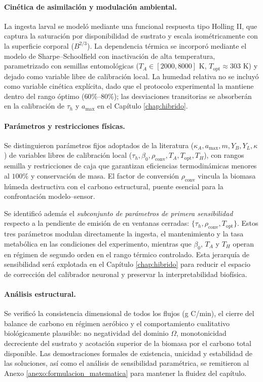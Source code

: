 \paragraph{Cinética de asimilación y modulación ambiental.} La ingesta larval se modeló mediante una funcional respuesta tipo Holling II, que captura la saturación por disponibilidad de sustrato y escala isométricamente con la superficie corporal ($B^{2/3}$). La dependencia térmica se incorporó mediante el modelo de Sharpe--Schoolfield con inactivación de alta temperatura, parametrizado con semillas entomológicas ($T_A \in [2000, 8000]$ K, $T_{\mathrm{opt}} \approx 303$ K) y dejado como variable libre de calibración local. La humedad relativa no se incluyó como variable cinética explícita, dado que el protocolo experimental la mantiene dentro del rango óptimo ($60\%$--$80\%$); las desviaciones transitorias se absorberán en la calibración de $\tau_h$ y $a_{\max}$ en el Capítulo \ref{chap:hibrido}.

\paragraph{Parámetros y restricciones físicas.} Se distinguieron parámetros fijos adoptados de la literatura ($\kappa_A, a_{\max}, m, Y_B, Y_L, \kappa$) de variables libres de calibración local ($\tau_h, \beta_0, \rho_{\mathrm{conv}}, T_A, T_{\mathrm{opt}}, T_H$), con rangos semilla y restricciones de caja que garantizan eficiencias termodinámicas menores al $100\%$ y conservación de masa. El factor de conversión $\rho_{\mathrm{conv}}$ vincula la biomasa húmeda destructiva con el carbono estructural, puente esencial para la confrontación modelo--sensor.

Se identificó además el \emph{subconjunto de parámetros de primera sensibilidad} respecto a la pendiente de emisión de  en ventanas cerradas: $\{\tau_h, \rho_{\mathrm{conv}}, T_{\mathrm{opt}}\}$. Estos tres parámetros modulan directamente la ingesta, el mantenimiento y la tasa metabólica en las condiciones del experimento, mientras que $\beta_0$, $T_A$ y $T_H$ operan en régimen de segundo orden en el rango térmico controlado. Esta jerarquía de sensibilidad será explotada en el Capítulo \ref{chap:hibrido} para reducir el espacio de corrección del calibrador neuronal y preservar la interpretabilidad biofísica.

\paragraph{Análisis estructural.} Se verificó la consistencia dimensional de todos los flujos (g C/min), el cierre del balance de carbono en régimen aeróbico y el comportamiento cualitativo biológicamente plausible: no negatividad del dominio $\Omega$, monotonicidad decreciente del sustrato y acotación superior de la biomasa por el carbono total disponible. Las demostraciones formales de existencia, unicidad y estabilidad de las soluciones, así como el análisis de sensibilidad paramétrica, se remitieron al Anexo \ref{anexo:formulacion_matematica} para mantener la fluidez del capítulo.

